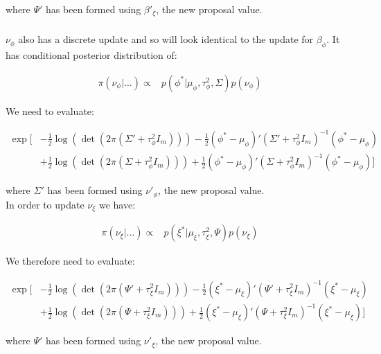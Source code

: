\documentclass{article}
\begin{document}
where $\Psi'$ has been formed using $\beta'_\xi$, the new proposal value. \\

\subsubsection*{\pmb{$\nu$}}

$\nu_\phi$ also has a discrete update and so will look identical to the update for $\beta_\phi$. It has conditional posterior distribution of:

\begin{align*}
\pi(\nu_\phi | \dots ) \propto & p(\phi^* | \mu_\phi, \tau^2_\phi, \Sigma) p(\nu_\phi)
\end{align*}

We need to evaluate:

\begin{align}
\exp \Big[ & - \frac{1}{2}  \log(\det(2 \pi (\Sigma' + \tau^2_\phi I_m))) -\frac{1}{2} (\phi^* - \mu_\phi)' (\Sigma' + \tau^2_\phi I_m)^{-1} (\phi^* - \mu_\phi) \nonumber \\
& + \frac{1}{2} \log(\det(2 \pi (\Sigma + \tau^2_\phi I_m))) + \frac{1}{2} (\phi^* - \mu_\phi)' (\Sigma + \tau^2_\phi I_m)^{-1} (\phi^* - \mu_\phi) \Big] \label{eq:2n1}
\end{align}

where $\Sigma'$ has been formed using $\nu'_\phi$, the new proposal value. \\

In order to update $\nu_\xi$ we have:

\begin{align*}
\pi(\nu_\xi | \dots ) \propto & p(\xi^* | \mu_\xi, \tau^2_\xi, \Psi) p(\nu_\xi)
\end{align*}

We therefore need to evaluate:

\begin{align}
\exp \Big[ & -\frac{1}{2} \log(\det(2 \pi (\Psi' + \tau^2_\xi I_m))) -\frac{1}{2} (\xi^* - \mu_\xi)' (\Psi' + \tau^2_\xi I_m)^{-1} (\xi^* - \mu_\xi) \nonumber \\
& + \frac{1}{2} \log(\det(2 \pi (\Psi + \tau^2_\xi I_m)))+ \frac{1}{2} (\xi^* - \mu_\xi)' (\Psi + \tau^2_\xi I_m)^{-1} (\xi^* - \mu_\xi) \Big] \label{eq:2n2}
\end{align}

where $\Psi'$ has been formed using $\nu'_\xi$, the new proposal value. \\
\end{document}
